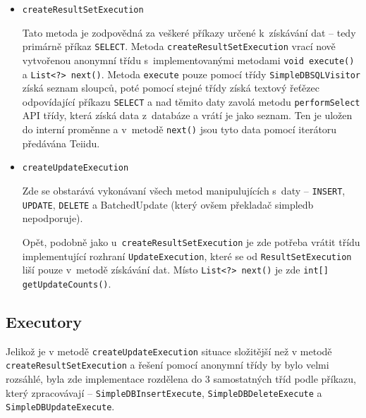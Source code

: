 \documentclass[oneside,12pt]{fithesis2}
\begin{document}
\begin{itemize}
 \item \texttt{createResultSetExecution}

Tato metoda je zodpovědná za veškeré příkazy určené k~získávání dat -- tedy primárně příkaz \texttt{SELECT}. Metoda
\texttt{createResultSet\allowbreak Execution} vrací nově vytvořenou anonymní třídu s~implementovanými metodami \texttt{void execute()} a \texttt{List<?> next()}. Metoda \texttt{execute} pouze pomocí třídy \texttt{SimpleDBSQLVisitor} získá seznam sloupců, poté pomocí stejné třídy získá textový řeťězec odpovídající příkazu \texttt{SELECT} a nad těmito daty zavolá metodu \texttt{performSelect} API třídy, která získá data z~databáze a vrátí je jako seznam. Ten je uložen do interní proměnne a v~metodě \texttt{next()} jsou tyto data pomocí iterátoru předávána Teiidu.

\item \texttt{createUpdateExecution}

Zde se obstarává vykonávaní všech metod manipulujících s~daty -- \texttt{INSERT}, \texttt{UPDATE}, \texttt{DELETE} a BatchedUpdate (který ovšem překladač simpledb nepodporuje).

Opět, podobně jako u~\texttt{createResultSetExecution} je zde potřeba vrátit třídu implementující rozhraní \texttt{UpdateExecution}, které se od \texttt{ResultSetExecution} liší pouze v~metodě získávání dat. Místo \texttt{List<?> next()} je zde \texttt{int[] getUpdateCounts()}. 
\end{itemize}
\subsection{Executory}
Jelikož je v metodě \texttt{createUpdateExecution} situace složitější než v metodě \texttt{createResultSetExecution} a řešení pomocí anonymní třídy by bylo velmi rozsáhlé, byla zde implementace rozdělena do 3 samostatných tříd podle příkazu, který zpracovávají -- \texttt{SimpleDBInsertExecute}, \texttt{SimpleDBDeleteExecute} a \texttt{SimpleDBUpdateExecute}.
\end{document}
